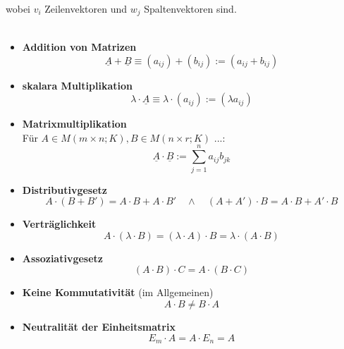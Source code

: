 \documentclass{article}
\begin{document}
wobei $v_i$ Zeilenvektoren und $w_j$ Spaltenvektoren sind.\\
\\
	\begin{itemize}
		\item \textbf{Addition von Matrizen}
			\begin{equation}
				\underline{A} + \underline{B} \equiv (a_{ij}) + (b_{ij}) := (a_{ij} + b_{ij})
			\end{equation}
		
		
		\item \textbf{skalara Multiplikation}
			\begin{equation}
				\lambda\cdot \underline{A} \equiv \lambda\cdot (a_{ij}) := (\lambda a_{ij})
			\end{equation}			
		
		
		\item \textbf{Matrixmultiplikation}\\
		Für $A\in M(m\times n; K), B\in M(n\times r; K)$ ...:
			\begin{equation}
				\underline{A} \cdot \underline{B} := \sum_{j=1}^n a_{ij} b_{jk}
			\end{equation}
	\end{itemize}
	

	\begin{itemize}
		\item \textbf{Distributivgesetz}
			\begin{equation}
				A\cdot (B + B') = A\cdot B + A\cdot B'\quad \wedge\quad (A + A')\cdot B = A\cdot B + A'\cdot B
			\end{equation}


		\item \textbf{Verträglichkeit}
			\begin{equation}
				A\cdot (\lambda\cdot B) = (\lambda\cdot A)\cdot B = \lambda\cdot (A\cdot B)
			\end{equation}


		\item \textbf{Assoziativgesetz}
			\begin{equation}
				(A\cdot B)\cdot C = A\cdot (B\cdot C)
			\end{equation}


		\item \textbf{Keine Kommutativität} (im Allgemeinen)
			\begin{equation}
				A\cdot B \neq B\cdot A
			\end{equation}


		\item \textbf{Neutralität der Einheitsmatrix}
			\begin{equation}
				E_m\cdot A = A\cdot E_n = A
			\end{equation}
	\end{itemize}
\end{document}
